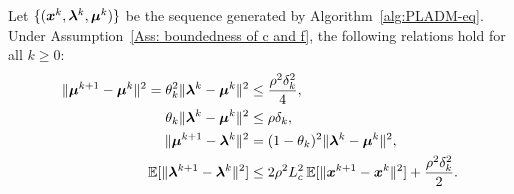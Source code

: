 \documentclass[10pt]{article}
\begin{document}
\begin{lemma}
\label{lem:basic-relations}
Let $\{(\bm{x}^k, \bm{\lambda}^k, \bm{\mu}^k)\}$ be the sequence generated by 
Algorithm~\ref{alg:PLADM-eq}. Under Assumption~\ref{Ass: boundedness of c and f}, the following 
relations hold for all $k \geq 0$:
\begin{align}
    \|\bm{\mu}^{k+1} - \bm{\mu}^k\|^2 = \theta_k^2 \|\bm{\lambda}^{k} - \bm{\mu}^k\|^2  &\leq \frac{\rho^2\delta_k^2}{4}, 
    \label{eq:mu-diff}\\
    \theta_k \|\bm{\lambda}^k - \bm{\mu}^k\|^2 &\leq \rho\delta_k, 
    \label{eq:theta-bound}\\
    \|\bm{\mu}^{k+1} - \bm{\lambda}^k\|^2 &= (1-\theta_k)^2\|\bm{\lambda}^k - \bm{\mu}^k\|^2,
    \label{eq:mu-lambda-diff}\\
    \mathbb{E}[\|\bm{\lambda}^{k+1} - \bm{\lambda}^k\|^2] &\leq 
    2\rho^2 L_c^2\,\mathbb{E}[\|\bm{x}^{k+1} - \bm{x}^k\|^2] + \frac{\rho^2\delta_k^2}{2}.
    \label{eq:lambda-diff}
\end{align}
\end{lemma}
 
 
 
\end{document}
